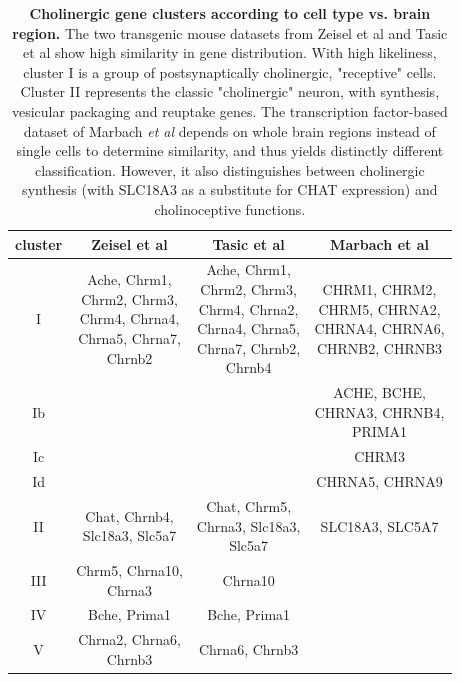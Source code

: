 \begin{table}[ht]
\sffamily
\small
\centering
\begin{tabular}{c | c | c | c}
cluster & Zeisel et al & Tasic et al & Marbach et al \\
\hline
\hline
I & \makecell{Ache, Chrm1, \\Chrm2, Chrm3, \\Chrm4, Chrna4, \\Chrna5, Chrna7, \\Chrnb2} & \makecell{Ache, Chrm1, \\Chrm2, Chrm3, \\Chrm4, Chrna2, \\Chrna4, Chrna5, \\Chrna7, Chrnb2, \\Chrnb4} & \makecell{CHRM1, CHRM2, \\CHRM5, CHRNA2, \\CHRNA4, CHRNA6, \\CHRNB2, CHRNB3} \\ \hline
Ib&  &  & \makecell{ACHE, BCHE, \\CHRNA3, CHRNB4, \\PRIMA1} \\ \hline
Ic& &  & CHRM3 \\ \hline
Id&  &  & CHRNA5, CHRNA9 \\ \hline
II& \makecell{Chat, Chrnb4, \\Slc18a3, Slc5a7} & \makecell{Chat, Chrm5, \\Chrna3, Slc18a3, \\Slc5a7} & SLC18A3, SLC5A7 \\ \hline
III& \makecell{Chrm5, Chrna10, \\Chrna3} & Chrna10 &  \\ \hline
IV&Bche, Prima1 & Bche, Prima1 &  \\ \hline
V& \makecell{Chrna2, Chrna6, \\Chrnb3} & Chrna6, Chrnb3 &  \\
\end{tabular}
\caption{\textbf{Cholinergic gene clusters according to cell type vs. brain region.} The two transgenic mouse datasets from Zeisel et al and Tasic et al show high similarity in gene distribution. With high likeliness, cluster I is a group of postsynaptically cholinergic, "receptive" cells. Cluster II represents the classic "cholinergic" neuron, with synthesis, vesicular packaging and reuptake genes. The transcription factor-based dataset of Marbach \emph{et al} depends on whole brain regions instead of single cells to determine similarity, and thus yields distinctly different classification. However, it also distinguishes between cholinergic synthesis (with SLC18A3 as a substitute for CHAT expression) and cholinoceptive functions.}
\label{tab:chol-clusters}
\end{table}

